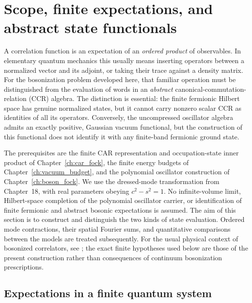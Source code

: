\section{Scope, finite expectations, and abstract state functionals}
\label{sec:ch19-scope}

A correlation function is an expectation of an \emph{ordered product} of
observables.  In elementary quantum mechanics this usually means inserting
operators between a normalized vector and its adjoint, or taking their trace
against a density matrix.  For the bosonization problem developed here, that
familiar operation must be distinguished from the evaluation of words in an
\emph{abstract} canonical-commutation-relation (CCR) algebra.  The distinction
is essential: the finite fermionic Hilbert space has genuine normalized states,
but it cannot carry nonzero scalar CCR as identities of all its operators.
Conversely, the uncompressed oscillator algebra admits an exactly positive,
Gaussian vacuum functional, but the construction of this functional does not
identify it with any finite-band fermionic ground state.

The prerequisites are the finite CAR representation and occupation-state
inner product of Chapter~\ref{ch:car_fock}, the finite energy budgets of
Chapter~\ref{ch:vacuum_budget}, and the polynomial oscillator construction of
Chapter~\ref{ch:boson_fock}.  We use the dressed-mode transformation from
Chapter~18, with real parameters obeying $c^2-s^2=1$.  No infinite-volume
limit, Hilbert-space completion of the polynomial oscillator carrier, or
identification of finite fermionic and abstract bosonic expectations is assumed.
The aim of this section is to construct and distinguish the two kinds of
state evaluation.  Ordered mode contractions, their spatial Fourier sums,
and quantitative comparisons between the models are treated subsequently.
For the usual physical context of bosonized correlators, see
\cite{giamarchi2004,vondelft1998}; the exact finite hypotheses used below
are those of the present construction rather than consequences of continuum
bosonization prescriptions.

\subsection{Expectations in a finite quantum system}

